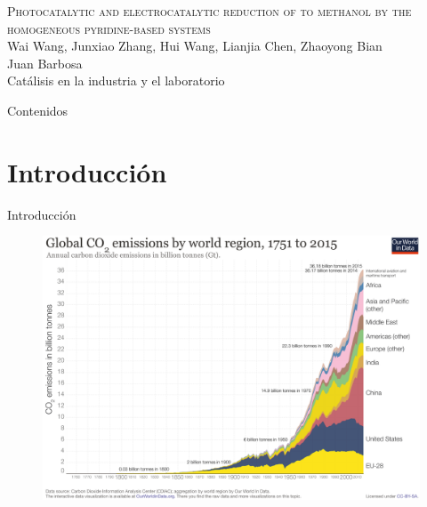\documentclass[handout]{beamer}
\begin{document}
	\begin{frame}
		\centering
		\textsc{\large Photocatalytic and electrocatalytic reduction of  to methanol by the homogeneous pyridine-based systems}
		\\
		\vspace{0.5cm}
		{\scriptsize Wai Wang, Junxiao Zhang, Hui Wang, Lianjia Chen, Zhaoyong Bian}
		\\
		\vspace{3cm}
		\raggedleft Juan Barbosa \\
		\raggedleft \small Catálisis en la industria y el laboratorio
	\end{frame}

\begin{frame}{Contenidos}
	\tableofcontents
\end{frame}

\section{Introducci\'on}
\begin{frame}{Introducci\'on}
	\begin{figure}[h]
		\centering
		\includegraphics[width=\linewidth]{sources/CO2_emissions}
	\end{figure}
\end{frame}
\end{document}
